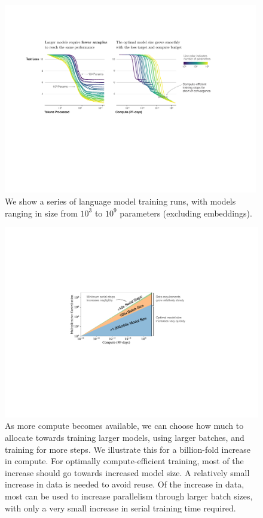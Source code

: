 \documentclass[english]{article}
\begin{document}
\begin{figure}
\noindent \centering{} \includegraphics[width=0.99\textwidth]{EfficiencyIllustration}
\caption[Illustration of sample efficiency and compute efficiency.]{We show a series of language model training runs, with models ranging in size from $10^3$ to $10^9$ parameters (excluding embeddings). \label{fig:EfficiencyIllustration}}
\end{figure}

\begin{figure}
\noindent \centering{} \includegraphics[height=0.32\textwidth]{ContributionIllustration}
\caption[How to scale up model size, batch size, and serial steps]{As more compute becomes available, we can choose how much to allocate towards training larger models, using larger batches, and training for more steps.  We illustrate this for a billion-fold increase in compute.  For optimally compute-efficient training, most of the increase should go towards increased model size.  A relatively small increase in data is needed to avoid reuse.  Of the increase in data, most can be used to increase parallelism through larger batch sizes, with only a very small increase in serial training time required.  \label{fig:ContributionIllustration} }
\end{figure}
\end{document}

